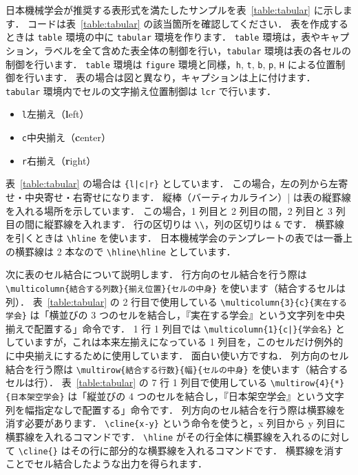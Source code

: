 日本機械学会が推奨する表形式を満たしたサンプルを表~\ref{table:tabular} に示します．
コードは表~\ref{table:tabular} の該当箇所を確認してください．
表を作成するときは \verb|table| 環境の中に \verb|tabular| 環境を作ります．
\verb|table| 環境は，表やキャプション，ラベルを全て含めた表全体の制御を行い，\verb|tabular| 環境は表の各セルの制御を行います．
\verb|table| 環境は \verb|figure| 環境と同様，\verb|h|, \verb|t|, \verb|b|, \verb|p|, \verb|H| による位置制御を行います．
表の場合は図と異なり，キャプションは上に付けます．
\verb|tabular| 環境内でセルの文字揃え位置制御は \verb|lcr| で行います．

\begin{itemize}
    \item \verb|l|\quad 左揃え（\textbf{l}eft）
    \item \verb|c|\quad 中央揃え（\textbf{c}enter）
    \item \verb|r|\quad 右揃え（\textbf{r}ight）
\end{itemize}

表~\ref{table:tabular} の場合は \texttt{\{l|c|r\}} としています．
この場合，左の列から左寄せ・中央寄せ・右寄せになります．
縦棒（バーティカルライン）\verb||| は表の縦罫線を入れる場所を示しています．
この場合，1 列目と 2 列目の間，2 列目と 3 列目の間に縦罫線を入れます．
行の区切りは \verb|\\|，列の区切りは \verb|&| です．
横罫線を引くときは \verb|\hline| を使います．
日本機械学会のテンプレートの表では一番上の横罫線は 2 本なので \verb|\hline\hline| としています．

次に表のセル結合について説明します．
行方向のセル結合を行う際は \verb|\multicolumn{結合する列数}{揃え位置}{セルの中身}| を使います（結合するセルは列）．
表~\ref{table:tabular} の 2 行目で使用している \verb|\multicolumn{3}{c}{実在する学会}| は「横並びの 3 つのセルを結合し，『実在する学会』という文字列を中央揃えで配置する」命令です．
1 行 1 列目では \texttt{\textbackslash multicolumn\{1\}\{c|\}\{学会名\}} としていますが，これは本来左揃えになっている 1 列目を，このセルだけ例外的に中央揃えにするために使用しています．
面白い使い方ですね．
列方向のセル結合を行う際は \verb|\multirow{結合する行数}{幅}{セルの中身}| を使います（結合するセルは行）．
表~\ref{table:tabular} の 7 行 1 列目で使用している \verb|\multirow{4}{*}{日本架空学会}| は「縦並びの 4 つのセルを結合し，『日本架空学会』という文字列を幅指定なしで配置する」命令です．
列方向のセル結合を行う際は横罫線を消す必要があります．
\verb|\cline{x-y}| という命令を使うと，x 列目から y 列目に横罫線を入れるコマンドです．
\verb|\hline| がその行全体に横罫線を入れるのに対して \verb|\cline{}| はその行に部分的な横罫線を入れるコマンドです．
横罫線を消すことでセル結合したような出力を得られます．

